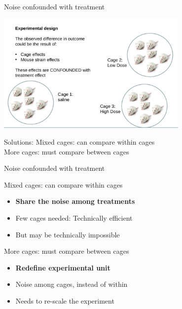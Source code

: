 \documentclass[10pt]{beamer}
\begin{document}
\begin{frame}{ Noise confounded with treatment}

 \begin{center}
  \includegraphics[width=0.7\textwidth]{Figures/mice}
 \end{center}
 
 \pause
 
 \begin{block}{Solutions:}
  Mixed cages: can compare within cages \\
  More cages: must compare between cages 
 \end{block}

\end{frame}

\begin{frame}{ Noise confounded with treatment}

  \begin{block}{Mixed cages: can compare within cages}
    \begin{itemize}
     \item \textbf{Share the noise among treatments}
     \item Few cages needed: Technically efficient
     \item But may be technically impossible
    \end{itemize}
  \end{block}

 \pause
 
 \begin{block}{More cages: must compare between cages }
    \begin{itemize}
    \item \textbf{Redefine experimental unit}
    \item Noise among cages, instead of within
    \item Needs to re-scale the experiment
    \end{itemize} 
 \end{block}

\end{frame}
\end{document}
